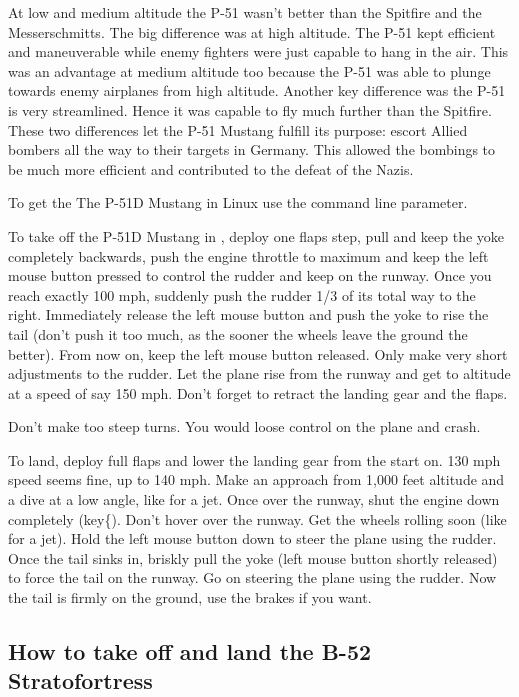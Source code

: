     At low and medium altitude the P-51 wasn't better than the Spitfire
    and the Messerschmitts. The big difference was at high altitude.
    The P-51 kept efficient and maneuverable while enemy fighters were
    just capable to hang in the air. This was an advantage at medium
    altitude too because the P-51 was able to plunge towards enemy
    airplanes from high altitude. Another key difference was the P-51
    is very streamlined. Hence it was capable to fly much further than
    the Spitfire. These two differences let the P-51 Mustang fulfill
    its purpose: escort Allied bombers all the way to their targets in
    Germany. This allowed the bombings to be much more efficient and
    contributed to the defeat of the Nazis.
    
    To get the The P-51D Mustang in Linux use the
     command line parameter.
    
    To take off the P-51D Mustang in \FlightGear, deploy one flaps step, pull
    and keep the yoke completely backwards, push the engine throttle to
    maximum and keep the left mouse button pressed to control the
    rudder and keep on the runway. Once you reach exactly 100 mph,
    suddenly push the rudder 1/3 of its total way to the right.
    Immediately release the left mouse button and push the yoke to rise
    the tail (don't push it too much, as the sooner the wheels leave
    the ground the better). From now on, keep the left mouse button
    released. Only make very short adjustments to the rudder. Let the
    plane rise from the runway and get to altitude at a speed of say
    150 mph. Don't forget to retract the landing gear and the flaps.

Don't make too steep turns. You would loose control on the plane and crash.

To land, deploy full flaps and lower the landing gear from the start
on. 130 mph speed seems fine, up to 140 mph. Make an approach from
1,000 feet altitude and a dive at a low angle, like for a jet. Once
over the runway, shut the engine down completely (key{\{}). Don't hover
over the runway. Get the wheels rolling soon (like for a jet). Hold the
left mouse button down to steer the plane using the rudder. Once the
tail sinks in, briskly pull the yoke (left mouse button shortly
released) to force the tail on the runway. Go on steering the plane
using the rudder. Now the tail is firmly on the ground, use the brakes
if you want.
    
    \subsection{How to take off and land the B-52 Stratofortress}
    \label{sec:B52}
  
